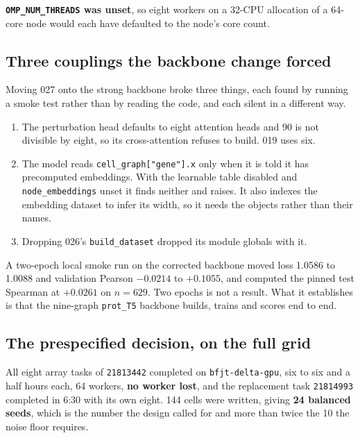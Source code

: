 \textbf{\texttt{OMP\_NUM\_THREADS} was unset}, so eight workers on a 32-CPU allocation of a
64-core node would each have defaulted to the node's core count.

\subsection{Three couplings the backbone change forced}
\label{sec:couplings}

Moving 027 onto the strong backbone broke three things, each found by running a smoke test
rather than by reading the code, and each silent in a different way.

\begin{enumerate}\setlength{\itemsep}{2pt}
  \item The perturbation head defaults to eight attention heads and 90 is not divisible by
    eight, so its cross-attention refuses to build. 019 uses six.
  \item The model reads \texttt{cell\_graph["gene"].x} only when it is told it has
    precomputed embeddings. With the learnable table disabled and \texttt{node\_embeddings}
    unset it finds neither and raises. It also indexes the embedding dataset to infer its
    width, so it needs the objects rather than their names.
  \item Dropping 026's \texttt{build\_dataset} dropped its module globals with it.
\end{enumerate}

A two-epoch local smoke run on the corrected backbone moved loss 1.0586 to 1.0088 and
validation Pearson $-0.0214$ to $+0.1055$, and computed the pinned test Spearman at
$+0.0261$ on $n = 629$. Two epochs is not a result. What it establishes is that the
nine-graph \texttt{prot\_T5} backbone builds, trains and scores end to end.

\subsection{The prespecified decision, on the full grid}

All eight array tasks of \texttt{21813442} completed on \texttt{bfjt-delta-gpu}, six to six
and a half hours each, 64 workers, \textbf{no worker lost}, and the replacement task
\texttt{21814993} completed in 6:30 with its own eight. 144 cells were written, giving
\textbf{24 balanced seeds}, which is the number the design called for and more than twice
the 10 the noise floor requires.

